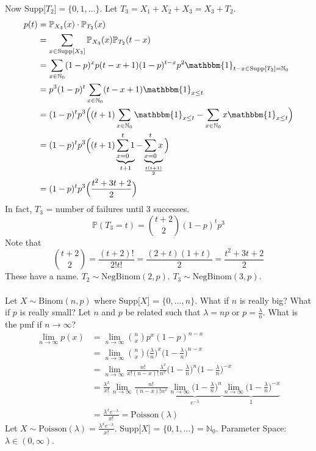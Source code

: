\documentclass[12pt]{article}
\newcommand{\prob}[1]{\mathbb{P}(#1)}
\newcommand{\probsub}[2]{\mathbb{P}_{#1}(#2)}
\newcommand{\indicator}[1]{\mathbbm{1}_{#1}}
\begin{document}
Now Supp[$T_2] = \{0, 1, \dots \}$. Let $T_3 = X_1 + X_2 + X_3 = X_3 + T_2$. $$\begin{aligned} p(t) &= \probsub{X_3}{x} \cdot \probsub{T_2}{x} \\ &= \sum_{x \in \text{Supp}[X_3]} \probsub{X_3}{x} \probsub{T_2}{t - x} \\ &= \sum_{x \in \mathbb{N}_0} (1 - p)^xp(t - x + 1)(1 - p)^{t - x}p^2 \indicator{t - x \in \text{Supp}[T_2] = \mathbb{N}_0} \\ &= p^3(1 - p)^t \sum_{x \in \mathbb{N}_0} (t - x + 1)\indicator{x \leq t} \\ &= (1 - p)^tp^3\Big((t + 1)\sum_{x \in \mathbb{N}_0} \indicator{x \leq t} - \sum_{x \in \mathbb{N}_0} x\indicator{x \leq t}\Big) \\ &= (1- p)^tp^3\Big((t + 1)\underbrace{\sum_{x = 0}^t 1}_{t + 1} - \underbrace{\sum_{x = 0}^t x}_{\frac{t(t + 1)}{2}}\Big) \\ &= (1 - p)^tp^3\Big( \frac{t^2 + 3t +2}{2}\Big) \end{aligned} $$ 
In fact, $T_3$ = number of failures until 3 successes. 
$$\prob{T_3 = t} = \binom{t + 2}{2}(1 - p)^tp^3 $$ 
Note that $$\binom{t + 2}{2} = \frac{(t + 2)!}{2!t!}= \frac{(2 + t)(1 + t)}{2} = \frac{t^2 + 3t + 2}{2} $$ 
These have a name. $T_2 \sim \text{NegBinom}(2, p)$. $T_3 \sim \text{NegBinom}(3, p)$. \\~\\
Let $X \sim \text{Binom}(n, p)$ where Supp[$X$] = $\{0, \dots, n\}$. What if $n$ is really big? What if $p$ is really small? Let $n$ and $p$ be related such that $\lambda = np$ or $p = \frac{\lambda}{n}$. What is the pmf if $n \to \infty$? 
$$\begin{aligned} \lim_{n \to \infty} p(x) &= \lim_{n \to \infty} \binom{n}{x} p^x(1 - p)^{n - x} \\ &= \lim_{n \to \infty} \binom{n}{x} \Big( \frac{\lambda}{n}\Big)^x \Big(1 - \frac{\lambda}{n}\Big)^{n- x} \\ &= \lim_{n \to \infty} \frac{n!}{x!(n - x)!} \frac{\lambda^x}{n^x}\Big( 1 - \frac{\lambda}{n}\Big)^n \Big(1 - \frac{\lambda}{n}\Big)^{-x} \\ &= \frac{\lambda^x}{x!} \lim_{n \to \infty} \frac{n!}{(n - x)!n^x} \underbrace{\lim_{n \to \infty} \Big( 1 - \frac{\lambda}{n}\Big)^n}_{e^{-\lambda}} \underbrace{\lim_{n \to \infty} \Big( 1 - \frac{\lambda}{n}\Big)^{-x}}_{1} \\ &= \frac{\lambda^x e^{-\lambda}}{x!} = \text{Poisson}(\lambda) \end{aligned} $$ 
Let $X \sim \text{Poisson}(\lambda) = \frac{\lambda^x e^{-\lambda}}{x!}$. Supp[$X$] = $\{0, 1, \dots\} = \mathbb{N}_0$. Parameter Space: $\lambda \in (0, \infty)$. \\~\\
\end{document}
